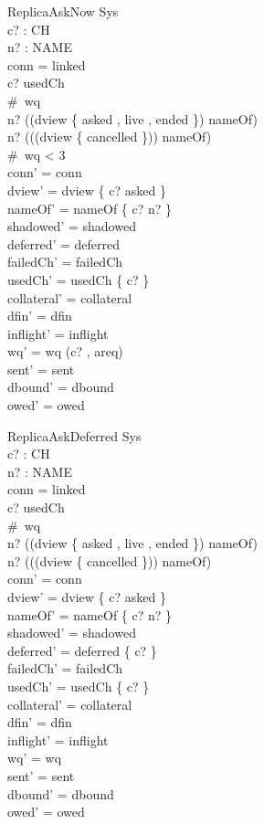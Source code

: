 \documentclass[a4paper,10pt,fleqn]{article}
\begin{document}
\begin{schema}{ReplicaAskNow}
  \Delta Sys \\
  c? : CH \\
  n? : NAME \\
\where
  conn = linked \\
  c? \notin usedCh \\
  \#~wq  \\
  n? \notin \ran (\dom (dview \rres \{ asked , live , ended \}) \dres nameOf) \\
  n? \notin \ran ((\dom (dview \rres \{ cancelled \})) \dres nameOf) \\
  \#~wq < 3 \\
  conn' = conn \\
  dview' = dview \oplus \{ c? \mapsto asked \} \\
  nameOf' = nameOf \cup \{ c? \mapsto n? \} \\
  shadowed' = shadowed \\
  deferred' = deferred \\
  failedCh' = failedCh \\
  usedCh' = usedCh \cup \{ c? \} \\
  collateral' = collateral \\
  dfin' = dfin \\
  inflight' = inflight \\
  wq' = wq \cat \langle (c? , areq) \rangle \\
  sent' = sent \\
  dbound' = dbound \\
  owed' = owed
\end{schema}

\begin{schema}{ReplicaAskDeferred}
  \Delta Sys \\
  c? : CH \\
  n? : NAME \\
\where
  conn = linked \\
  c? \notin usedCh \\
  \#~wq  \\
  n? \notin \ran (\dom (dview \rres \{ asked , live , ended \}) \dres nameOf) \\
  n? \in \ran ((\dom (dview \rres \{ cancelled \})) \dres nameOf) \\
  conn' = conn \\
  dview' = dview \oplus \{ c? \mapsto asked \} \\
  nameOf' = nameOf \cup \{ c? \mapsto n? \} \\
  shadowed' = shadowed \\
  deferred' = deferred \cup \{ c? \} \\
  failedCh' = failedCh \\
  usedCh' = usedCh \cup \{ c? \} \\
  collateral' = collateral \\
  dfin' = dfin \\
  inflight' = inflight \\
  wq' = wq \\
  sent' = sent \\
  dbound' = dbound \\
  owed' = owed
\end{schema}
\end{document}
